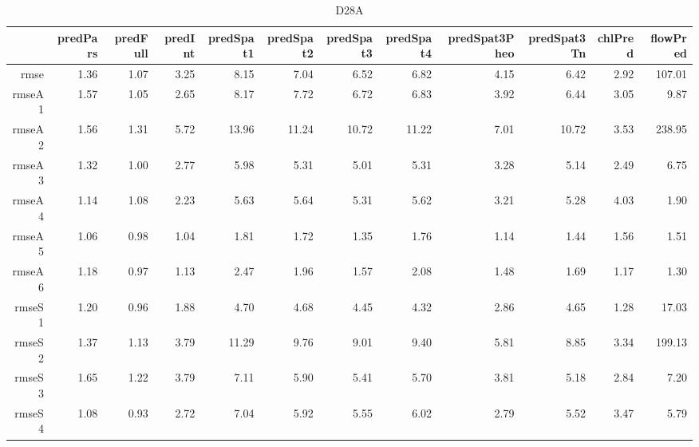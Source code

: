 \begin{table}[H]
\centering
\begingroup\fontsize{2.5pt}{4pt}\selectfont
\begin{tabular}{rrrrrrrrrrrr}
  \hline
 & predPars & predFull & predInt & predSpat1 & predSpat2 & predSpat3 & predSpat4 & predSpat3Pheo & predSpat3Tn & chlPred & flowPred \\ 
  \hline
rmse & 1.36 & 1.07 & 3.25 & 8.15 & 7.04 & 6.52 & 6.82 & 4.15 & 6.42 & 2.92 & 107.01 \\ 
  rmseA1 & 1.57 & 1.05 & 2.65 & 8.17 & 7.72 & 6.72 & 6.83 & 3.92 & 6.44 & 3.05 & 9.87 \\ 
  rmseA2 & 1.56 & 1.31 & 5.72 & 13.96 & 11.24 & 10.72 & 11.22 & 7.01 & 10.72 & 3.53 & 238.95 \\ 
  rmseA3 & 1.32 & 1.00 & 2.77 & 5.98 & 5.31 & 5.01 & 5.31 & 3.28 & 5.14 & 2.49 & 6.75 \\ 
  rmseA4 & 1.14 & 1.08 & 2.23 & 5.63 & 5.64 & 5.31 & 5.62 & 3.21 & 5.28 & 4.03 & 1.90 \\ 
  rmseA5 & 1.06 & 0.98 & 1.04 & 1.81 & 1.72 & 1.35 & 1.76 & 1.14 & 1.44 & 1.56 & 1.51 \\ 
  rmseA6 & 1.18 & 0.97 & 1.13 & 2.47 & 1.96 & 1.57 & 2.08 & 1.48 & 1.69 & 1.17 & 1.30 \\ 
  rmseS1 & 1.20 & 0.96 & 1.88 & 4.70 & 4.68 & 4.45 & 4.32 & 2.86 & 4.65 & 1.28 & 17.03 \\ 
  rmseS2 & 1.37 & 1.13 & 3.79 & 11.29 & 9.76 & 9.01 & 9.40 & 5.81 & 8.85 & 3.34 & 199.13 \\ 
  rmseS3 & 1.65 & 1.22 & 3.79 & 7.11 & 5.90 & 5.41 & 5.70 & 3.81 & 5.18 & 2.84 & 7.20 \\ 
  rmseS4 & 1.08 & 0.93 & 2.72 & 7.04 & 5.92 & 5.55 & 6.02 & 2.79 & 5.52 & 3.47 & 5.79 \\ 
   \hline
\end{tabular}
\endgroup
\caption{D28A} 
\end{table}
